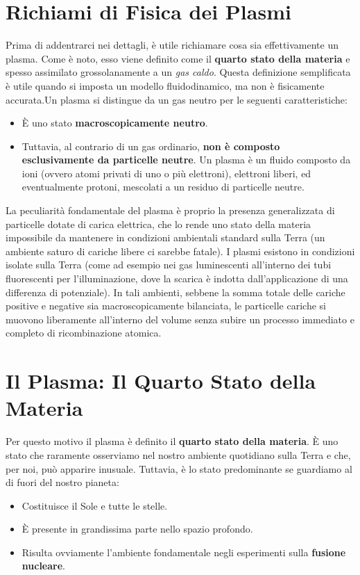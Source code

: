 \section{Richiami di Fisica dei Plasmi}
Prima di addentrarci nei dettagli, è utile richiamare cosa sia effettivamente un plasma. Come è noto, esso viene definito come il \textbf{quarto stato della materia} e spesso assimilato grossolanamente a un \textit{gas caldo}. Questa definizione semplificata è utile quando si imposta un modello fluidodinamico, ma non è fisicamente accurata.Un plasma si distingue da un gas neutro per le seguenti caratteristiche:\begin{itemize}\item È uno stato \textbf{macroscopicamente neutro}.\item Tuttavia, al contrario di un gas ordinario, \textbf{non è composto esclusivamente da particelle neutre}. Un plasma è un fluido composto da ioni (ovvero atomi privati di uno o più elettroni), elettroni liberi, ed eventualmente protoni, mescolati a un residuo di particelle neutre.\end{itemize}La peculiarità fondamentale del plasma è proprio la presenza generalizzata di particelle dotate di carica elettrica, che lo rende uno stato della materia impossibile da mantenere in condizioni ambientali standard sulla Terra (un ambiente saturo di cariche libere ci sarebbe fatale). I plasmi esistono in condizioni isolate sulla Terra (come ad esempio nei gas luminescenti all'interno dei tubi fluorescenti per l'illuminazione, dove la scarica è indotta dall'applicazione di una differenza di potenziale). In tali ambienti, sebbene la somma totale delle cariche positive e negative sia macroscopicamente bilanciata, le particelle cariche si muovono liberamente all'interno del volume senza subire un processo immediato e completo di ricombinazione atomica.

\section{Il Plasma: Il Quarto Stato della Materia}

Per questo motivo il plasma è definito il \textbf{quarto stato della materia}. È uno stato che raramente osserviamo nel nostro ambiente quotidiano sulla Terra e che, per noi, può apparire inusuale. Tuttavia, è lo stato predominante se guardiamo al di fuori del nostro pianeta:

\begin{itemize}
    \item Costituisce il Sole e tutte le stelle.
    \item È presente in grandissima parte nello spazio profondo.
    \item Risulta ovviamente l'ambiente fondamentale negli esperimenti sulla \textbf{fusione nucleare}.
\end{itemize}

